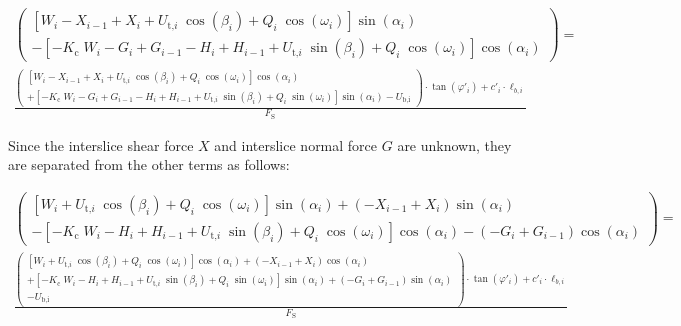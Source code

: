 \documentclass[12pt]{article}
\begin{document}
\begin{equation*}
\begin{array}{l} \left( \begin{array}{l} \left[
W_{i} -X_{i-1} + X_{i} +
{U_{\text{t,}i}}\;{\cos\left(\beta_{i}\right)} +
Q_{i}\;{\cos\left(\omega_{i}\right)}
\right]\sin\left(\alpha_{i}\right) \\ - \left[
{-K_{\text{c}}}\;{W_{i}} - G_{i} + G_{i-1}
- H_{i} + H_{i-1} +
{U_{\text{t,}i}}\;{\sin\left(\beta_{i}\right)} +
Q_{i}\;{\cos\left(\omega_{i}\right)}
\right]\cos\left(\alpha_{i}\right) \end{array} \right) =\\ \frac { 
	\left( \begin{array}{l}
	\left[ W_{i} - X_{i-1} + X_{i} +
	{U_{\text{t,}i}}\;{\cos\left(\beta_{i}\right)} +
	Q_{i}\;{\cos\left(\omega_{i}\right)}
	\right]\cos\left(\alpha_{i}\right) \\ + \left[
	{-K_{\text{c}}}\;{W_{i}} - G_{i} + G_{i-1} -
	H_{i} + H_{i-1} +
	{U_{\text{t,}i}}\;{\sin\left(\beta_{i}\right)} +
	Q_{i}\;{\sin\left(\omega_{i}\right)}
	\right]\sin\left(\alpha_{i}\right) -
	U_{\text{b,i}} \end{array} \right) \cdot \tan\left( \varphi'_{i}
	\right) + c'_i \cdot \ell_{b,i} }{F_\text{S}} \end{array}
\end{equation*}

\noindent Since the interslice shear force $X$ and interslice normal force $G$ 
are unknown, they are separated from the other terms as follows:

\begin{equation*}
\begin{array}{l} \left( \begin{array}{l} \left[
		W_{i} +
		{U_{\text{t,}i}}\;{\cos\left(\beta_{i}\right)} +
		Q_{i}\;{\cos\left(\omega_{i}\right)}
		\right]\sin\left(\alpha_{i}\right) + \left(-X_{i-1} + 
		X_{i}\right)\sin\left(\alpha_{i}\right)\\ - \left[
		{-K_{\text{c}}}\;{W_{i}}
		- H_{i} + H_{i-1} +
		{U_{\text{t,}i}}\;{\sin\left(\beta_{i}\right)} +
		Q_{i}\;{\cos\left(\omega_{i}\right)}
		\right]\cos\left(\alpha_{i}\right) - \left(- G_{i} + 
		G_{i-1}\right)\cos\left(\alpha_{i}\right) \end{array} 
		\right) =\\ \frac 
		{ 
		\left( \begin{array}{l}
			\left[ W_{i} +
			{U_{\text{t,}i}}\;{\cos\left(\beta_{i}\right)} +
			Q_{i}\;{\cos\left(\omega_{i}\right)}
			\right]\cos\left(\alpha_{i}\right) + \left(- X_{i-1} 
			+ X_{i}\right)\cos\left(\alpha_{i}\right) \\ + \left[
			{-K_{\text{c}}}\;{W_{i}} -
			H_{i} + H_{i-1} +
			{U_{\text{t,}i}}\;{\sin\left(\beta_{i}\right)} +
			Q_{i}\;{\sin\left(\omega_{i}\right)}
			\right]\sin\left(\alpha_{i}\right) + \left(- G_{i} + 
			G_{i-1}\right)\sin\left(\alpha_{i}\right)\\ -
			U_{\text{b,i}} \end{array} \right) \cdot \tan\left( 
			\varphi'_{i}
		\right) + c'_i \cdot \ell_{b,i} }{F_\text{S}} \end{array}
\end{equation*}
\end{document}
